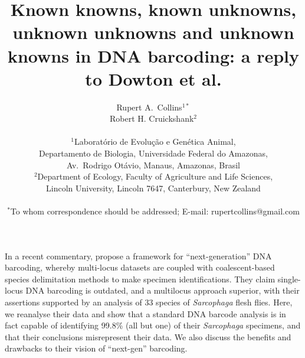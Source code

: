 \documentclass[12pt]{article}
\title{\bf Known knowns, known unknowns, unknown unknowns and unknown knowns in DNA barcoding: a reply to Dowton et al.}
\author
{Rupert A.\ Collins$^{1*}$\\
Robert H. Cruickshank$^{2}$\\
\\
\normalsize{$^{1}$Laborat\'orio de Evolu\c c\~ao e Gen\'etica Animal,}\\
\normalsize{Departamento de Biologia, Universidade Federal do Amazonas,}\\
\normalsize{Av.\ Rodrigo Ot\'avio, Manaus, Amazonas, Brasil}\\
\normalsize{$^{2}$Department of Ecology, Faculty of Agriculture and Life Sciences,}\\
\normalsize{Lincoln University,  Lincoln 7647,  Canterbury, New Zealand}\\
\\
\normalsize{$^\ast$To whom correspondence should be addressed; E-mail:  rupertcollins@gmail.com}
}
\date{}
\newenvironment{sciabstract}{%
\begin{quote} }
{\end{quote}}
\begin{document}
 
\maketitle 



%
%
%
%
%

In a recent commentary, \citet{Dowton2014} propose a framework for “next-generation” DNA barcoding, whereby multi-locus datasets are coupled with coalescent-based species delimitation methods to make specimen identifications. They claim single-locus DNA barcoding is outdated, and a multilocus approach superior, with their assertions supported by an analysis of 33 species of \emph{Sarcophaga} flesh flies. Here, we reanalyse their data and show that a standard DNA barcode analysis is in fact capable of identifying 99.8\% (all but one) of their \emph{Sarcophaga} specimens, and that their conclusions misrepresent their data. We also discuss the benefits and drawbacks to their vision of ``next-gen'' barcoding.
\end{document}
